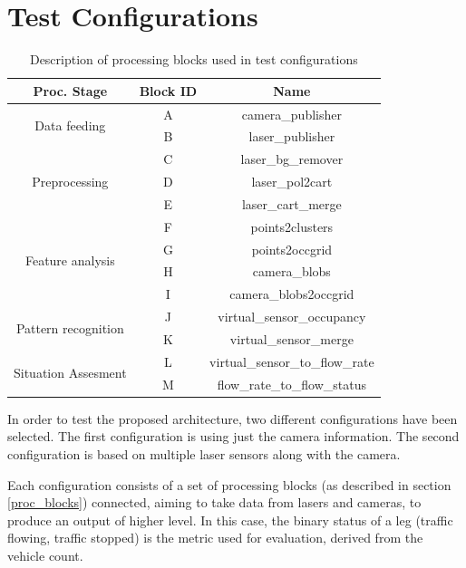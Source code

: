 \section{Test Configurations}

\begin{table}[ht!]
\footnotesize
\centering
\begin{tabular}{|c | c| c|}
\hline
\textbf{Proc. Stage} & \textbf{Block ID} & \textbf{Name} \\
\hline

\multirow{2}{*}{Data feeding} &
A & camera\_publisher \\
\cline{2-3} 
& B & laser\_publisher \\
\hline

\multirow{3}{*}{Preprocessing} &
C & laser\_bg\_remover \\
\cline{2-3}
& D & laser\_pol2cart \\
\cline{2-3}
& E & laser\_cart\_merge \\
\hline

\multirow{4}{*}{Feature analysis} &
F & points2clusters \\
\cline{2-3}
& G & points2occgrid \\
\cline{2-3}
& H & camera\_blobs \\
\cline{2-3}
& I & camera\_blobs2occgrid \\
\hline

\multirow{2}{*}{Pattern recognition} &
J & virtual\_sensor\_occupancy \\
\cline{2-3}
& K & virtual\_sensor\_merge \\
\hline

\multirow{2}{*}{Situation Assesment} &
L & virtual\_sensor\_to\_flow\_rate \\
\cline{2-3}
& M & flow\_rate\_to\_flow\_status \\
\hline

\end{tabular}
\caption{Description of processing blocks used in test configurations}
\label{desc_test_config}
\end{table}

In order to test the proposed architecture, two different configurations have been selected. The first configuration is using just the camera information. The second configuration is based on multiple laser sensors along with the camera.

Each configuration consists of a set of processing blocks (as described in section \ref{proc_blocks}) connected, aiming to take data from  lasers and cameras, to produce an output of higher level. In this case, the binary status of a leg (traffic flowing, traffic stopped) is the metric used for evaluation, derived from the vehicle count.

